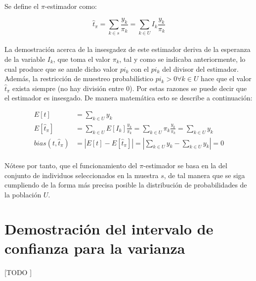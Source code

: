 \documentclass{article}
\begin{document}
    \paragraph{}
    Se define el $\pi$-estimador como:

    \begin{equation}
      \widehat{t}_\pi = \sum_{k \in s} \frac{y_k}{\pi_k} = \sum_{k \in U} I_k \frac{y_k}{\pi_k}
    \end{equation}

    \paragraph{}
    La demostración acerca de la insesgadez de este estimador deriva de la esperanza de la variable $I_k$, que toma el valor $\pi_k$, tal y como se indicaba anteriormente, lo cual produce que se anule dicho valor $pi_k$ con el $pi_k$  del divisor del estimador. Además, la restricción de muestreo probabilístico $pi_k > 0 \forall k \in U$ hace que el valor $\widehat{t}_\pi$ exista siempre (no hay división entre 0). Por estas razones se puede decir que el estimador es insesgado. De manera matemática esto se describe a continuación:

    \begin{align}
      E[t] &= \sum_{k \in U} y_k \\
      E[\widehat{t}_\pi] &= \sum_{k \in U} E[I_k] \frac{y_k}{\pi_k} = \sum_{k \in U} \pi_k \frac{y_k}{\pi_k} =\sum_{k \in U} y_k \\
      bias(t, \widehat{t}_\pi) &= \left| E[t] - E[\widehat{t}_\pi] \right| = \left| \sum_{k \in U} y_k - \sum_{k \in U} y_k \right| = 0
    \end{align}

    \paragraph{}
    Nótese por tanto, que el funcionamiento del $\pi$-estimador se basa en la  del conjunto de individuos seleccionados en la muestra $s$, de tal manera que se siga cumpliendo de la forma más precisa posible la distribución de probabilidades de la población $U$.

  \section{Demostración del intervalo de confianza para la varianza}
  \label{sec:demostration_1}

    \paragraph{}
    [TODO ]

	\nocite{muest2017}
  \nocite{sarndal2003model}

  
  
\end{document}
